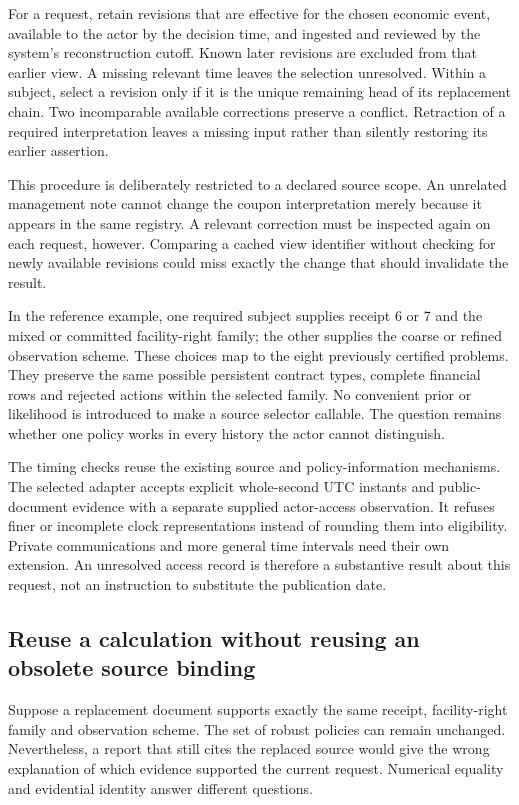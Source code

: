 For a request, retain revisions that are effective for the chosen economic event, available to the actor by the decision time, and ingested and reviewed by the system's reconstruction cutoff. Known later revisions are excluded from that earlier view. A missing relevant time leaves the selection unresolved. Within a subject, select a revision only if it is the unique remaining head of its replacement chain. Two incomparable available corrections preserve a conflict. Retraction of a required interpretation leaves a missing input rather than silently restoring its earlier assertion.

This procedure is deliberately restricted to a declared source scope. An unrelated management note cannot change the coupon interpretation merely because it appears in the same registry. A relevant correction must be inspected again on each request, however. Comparing a cached view identifier without checking for newly available revisions could miss exactly the change that should invalidate the result.

In the reference example, one required subject supplies receipt 6 or 7 and the mixed or committed facility-right family; the other supplies the coarse or refined observation scheme. These choices map to the eight previously certified problems. They preserve the same possible persistent contract types, complete financial rows and rejected actions within the selected family. No convenient prior or likelihood is introduced to make a source selector callable. The question remains whether one policy works in every history the actor cannot distinguish.

The timing checks reuse the existing source and policy-information mechanisms. The selected adapter accepts explicit whole-second UTC instants and public-document evidence with a separate supplied actor-access observation. It refuses finer or incomplete clock representations instead of rounding them into eligibility. Private communications and more general time intervals need their own extension. An unresolved access record is therefore a substantive result about this request, not an instruction to substitute the publication date.

\subsection{Reuse a calculation without reusing an obsolete source binding}

Suppose a replacement document supports exactly the same receipt, facility-right family and observation scheme. The set of robust policies can remain unchanged. Nevertheless, a report that still cites the replaced source would give the wrong explanation of which evidence supported the current request. Numerical equality and evidential identity answer different questions.

